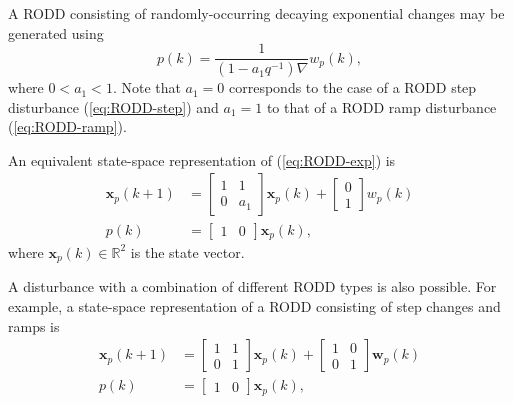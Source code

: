 A RODD consisting of randomly-occurring decaying exponential changes may be generated using
\begin{equation} \label{eq:RODD-exp}
	p(k)= \frac{1}{(1-a_1q^{-1})\nabla}w_p(k),
\end{equation}
where  $0<a_1<1$. Note that $a_1=0$ corresponds to the case of a RODD step disturbance (\ref{eq:RODD-step}) and $a_1=1$ to that of a RODD ramp disturbance (\ref{eq:RODD-ramp}). 

An equivalent state-space representation of (\ref{eq:RODD-exp}) is
\begin{equation} \label{eq:RODD-ss}
	\begin{split}
		\mathbf{x}_p(k+1) & =\left[\begin{array}{cc}
			1 & 1 \\
			0 & a_1
		\end{array}\right] \mathbf{x}_p(k) +\left[\begin{array}{cc}
			0 \\
			1
		\end{array}\right] w_p(k) \\
		p(k) & =\left[\begin{array}{cc}
			1 & 0
		\end{array}\right] \mathbf{x}_p(k),
	\end{split}
\end{equation}
where $\mathbf{x}_p(k) \in \mathbb{R}^2$ is the state vector.

A disturbance with a combination of different RODD types is also possible.  For example, a state-space representation of a RODD consisting of step changes and ramps is
\begin{equation} \label{eq:RODD-step-ramp}
	\begin{split}
		\mathbf{x}_p(k+1) & =\left[\begin{array}{cc}
			1 & 1 \\
			0 & 1
		\end{array}\right] \mathbf{x}_p(k) +\left[\begin{array}{cc}
			1 & 0 \\
			0 & 1
		\end{array}\right] \mathbf{w}_p(k) \\
		p(k) & =\left[\begin{array}{cc}
			1 & 0
		\end{array}\right] \mathbf{x}_p(k),
	\end{split}
\end{equation}

